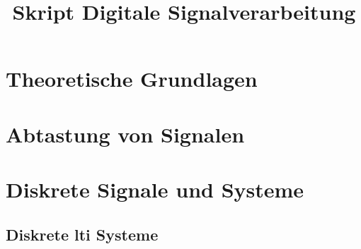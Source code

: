 \documentclass[ngerman]{article}
\title{Skript Digitale Signalverarbeitung}
\begin{document}

%
%
\section{Theoretische Grundlagen}\label{basics}
%

%
%
\section{Abtastung von Signalen}\label{sec:sampling}
%

%
%
%
\section{Diskrete Signale und Systeme}\label{disc_sys}
%

%
\subsection{Diskrete \texorpdfstring{\acrshort{lti}}{LTI} Systeme}\label{sec:disc_lti}
%

%

\end{document}
